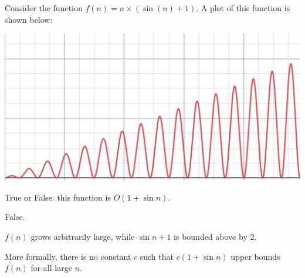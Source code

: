 \begin{prob}
    Consider the function $f(n) = n \times (\sin(n) + 1)$. A plot of this function
    is shown below:

    \includegraphics{./plot.png}

    True or False: this function is $O(1 + \sin n)$.

    \tF{}

    \begin{soln}
        False.

        $f(n)$ grows arbitrarily large, while $\sin n + 1$ is bounded above by 2.

        More formally, there is no constant $c$ such that $c (1 + \sin n)$
        upper bounds $f(n)$ for all large $n$.
    \end{soln}
\end{prob}
